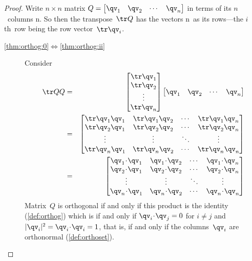 \begin{proof} 
Write \(n\times n\) matrix \(Q=\begin{bmatrix} \qv_1&\qv_2&\cdots&\qv_n \end{bmatrix}\) in terms of its \(n\)~columns \hlist\qv n.
So then the transpose~\(\tr Q\) has the vectors \hlist\qv n\ as its rows---the \(i\)th~row being the row vector~\(\tr\qv_i\).
\begin{description}
\item[\ref{thm:orthog:0}$\iff$\ref{thm:orthog:ii}]   Consider
\begin{eqnarray*}
\tr QQ
&=&\begin{bmatrix} \tr\qv_1\\\tr\qv_2\\\vdots\\\tr\qv_n \end{bmatrix}
\begin{bmatrix} \qv_1&\qv_2&\cdots&\qv_n \end{bmatrix}
\\&=&\begin{bmatrix} \tr\qv_1\qv_1&\tr\qv_1\qv_2&\cdots&\tr\qv_1\qv_n 
\\ \tr\qv_2\qv_1&\tr\qv_2\qv_2&\cdots&\tr\qv_2\qv_n 
\\\vdots&\vdots&\ddots&\vdots
\\ \tr\qv_n\qv_1&\tr\qv_n\qv_2&\cdots&\tr\qv_n\qv_n \end{bmatrix}
\\&=&\begin{bmatrix} \qv_1\cdot\qv_1&\qv_1\cdot\qv_2&\cdots&\qv_1\cdot\qv_n 
\\ \qv_2\cdot\qv_1&\qv_2\cdot\qv_2&\cdots&\qv_2\cdot\qv_n 
\\\vdots&\vdots&\ddots&\vdots
\\ \qv_n\cdot\qv_1&\qv_n\cdot\qv_2&\cdots&\qv_n\cdot\qv_n \end{bmatrix}
\end{eqnarray*}
Matrix~\(Q\) is orthogonal if and only if this product is the identity  (\autoref{def:orthog}) which is if and only if \(\qv_i\cdot\qv_j=0\) for \(i\neq j\) and \(|\qv_i|^2=\qv_i\cdot\qv_i=1\), that is, if and only if the columns~\(\qv_i\) are orthonormal (\autoref{def:orthoset}).


\end{description}
\end{proof}
